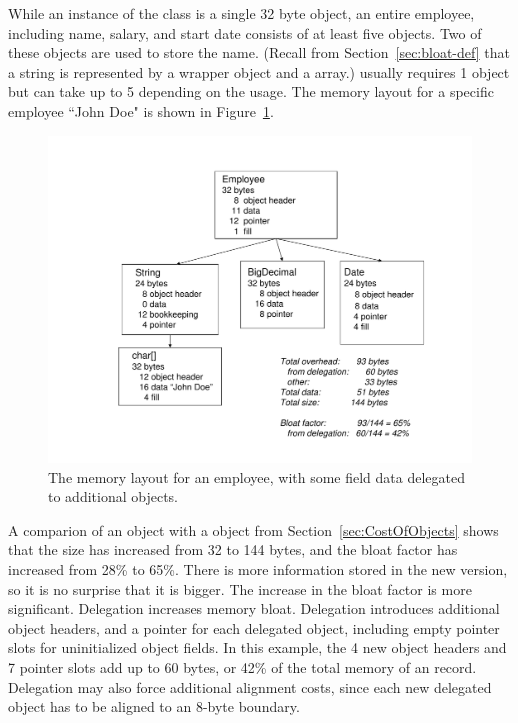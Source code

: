 While an instance of the  class is a single 32
byte object, an entire employee, including name, salary, and start date
consists of at least five objects. Two of these objects
are used to store the name. (Recall from Section~\ref{sec:bloat-def} that a string is represented by a
wrapper  object and a  array.) 
usually requires 1 object but can take up to 5 depending on the usage.
The memory layout for a specific employee ``John Doe" is shown in Figure~\ref{fig:employee-status}.
 \begin{figure}
  \centering
 \includegraphics[width=.80\textwidth]{part1/Figures/modelingdatatypes/employee-status.pdf}
  \caption{The memory layout for an employee, with some field data
  delegated to additional objects.}
  \label{fig:employee-status}
\end{figure}



A comparion of an  object with a
 object from Section~\ref{sec:CostOfObjects} shows that
the size has increased from 32 to 144 bytes, and the bloat factor has increased
from 28\% to 65\%.
There is more information stored in the new version, so it is no surprise that it is bigger. The increase
in the bloat factor is more significant. Delegation increases memory bloat. Delegation introduces additional
object headers, and a pointer for each delegated object, including empty
pointer slots for uninitialized object fields. In this example, the
4 new object headers and 7 pointer slots add up to 60 bytes, or
42\% of the total memory of an  record. Delegation may also
force additional alignment costs, since each new delegated object has to be aligned
to an 8-byte boundary.


